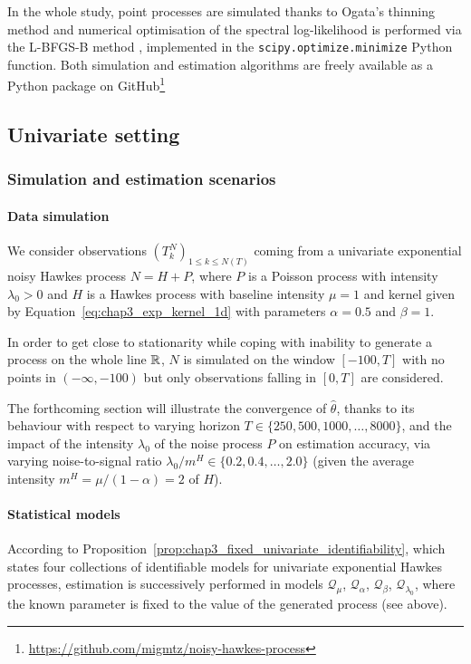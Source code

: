   In the whole study, point processes are simulated thanks to Ogata's thinning method \parencite{Ogata1981}
  and numerical optimisation of the spectral log-likelihood is performed via the L-BFGS-B method \parencite{Byrd1995}, implemented in the \texttt{scipy.optimize.minimize} Python function.
  Both simulation and estimation algorithms are freely available as a Python package on GitHub\footnote{\url{https://github.com/migmtz/noisy-hawkes-process}}
        
  \subsection{Univariate setting}\label{sec:chap3_univariate_numerical_results}


    \subsubsection{Simulation and estimation scenarios}\label{sec:chap3_uni_simulation}
      \paragraph{Data simulation}
        We consider observations $(T_k^N)_{1 \le k \le N(T)}$ coming from a univariate exponential noisy Hawkes process $N = H+P$,
        where $P$ is a Poisson process with intensity $\lambda_0 > 0$
        and $H$ is a Hawkes process with baseline intensity $\mu = 1$ and kernel given by Equation~\eqref{eq:chap3_exp_kernel_1d}
        with parameters $\alpha=0.5$ and $\beta=1$.

        In order to get close to stationarity while coping with inability to generate a process on the whole line ${\mathbb R}$,
        $N$ is simulated on the window $[-100, T]$ with no points in $(-\infty, -100)$
        but only observations falling in $[0, T]$ are considered.
        
        The forthcoming section will illustrate the convergence of $\hat \theta$,
        thanks to its behaviour with respect to varying horizon $T \in \{250, 500, 1000, \dots, 8000\}$,
        and the impact of the intensity $\lambda_0$ of the noise process $P$ on estimation accuracy,
        via varying noise-to-signal ratio ${\lambda_0}/{m^H} \in \{ 0.2, 0.4, \dots, 2.0 \}$
        (given the average intensity $m^H = {\mu}/{(1-\alpha)}=2$ of $H$).
        

      \paragraph{Statistical models}
        According to Proposition~\ref{prop:chap3_fixed_univariate_identifiability},
        which states four collections of identifiable models for univariate exponential Hawkes processes,
        estimation is successively performed in models $\mathcal Q_{\mu}$, $\mathcal Q_{\alpha}$, $\mathcal Q_{\beta}$, $\mathcal Q_{\lambda_0}$,
        where the known parameter is fixed to the value of the generated process (see above).
        
